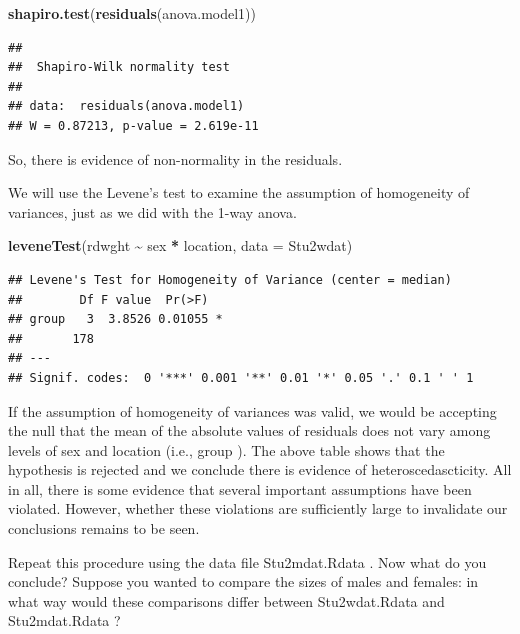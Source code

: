\documentclass[
  12pt,
]{book}
\makeatletter
\newenvironment{Shaded}{\begin{snugshade}}{\end{snugshade}}
\newcommand{\DataTypeTok}[1]{\textcolor[rgb]{0.13,0.29,0.53}{#1}}
\newcommand{\KeywordTok}[1]{\textcolor[rgb]{0.13,0.29,0.53}{\textbf{#1}}}
\newcommand{\NormalTok}[1]{#1}
\newcommand{\OperatorTok}[1]{\textcolor[rgb]{0.81,0.36,0.00}{\textbf{#1}}}
\newcommand{\StringTok}[1]{\textcolor[rgb]{0.31,0.60,0.02}{#1}}
\newenvironment{kframe}{%
\medskip{}
\setlength{\fboxsep}{.8em}
\def\at@end@of@kframe{}%
\ifinner\ifhmode%
 \def\at@end@of@kframe{\end{minipage}}%
 \begin{minipage}{\columnwidth}%
\fi\fi%
\def\FrameCommand##1{\hskip\@totalleftmargin \hskip-\fboxsep
\colorbox{incolor}{##1}\hskip-\fboxsep
    \hskip-\linewidth \hskip-\@totalleftmargin \hskip\columnwidth}%
\MakeFramed {\advance\hsize-\width
  \@totalleftmargin\z@ \linewidth\hsize
  \@setminipage}}%
{\par\unskip\endMakeFramed%
\at@end@of@kframe}
\newenvironment{rmdblock}[1]
 {
 \begin{itemize}
 \renewcommand{\labelitemi}{
   \raisebox{-.7\height}[0pt][0pt]{
     {\setkeys{Gin}{width=3em,keepaspectratio}\texttt{[image: images/\#1]}}
   }
 }
 \begin{kframe}
 \setlength{\fboxsep}{1em}
 \item
 }
 {
 \end{kframe}
 \end{itemize}
 }
\newenvironment{rmdcode}
  {\begin{rmdblock}{screen}}
  {\end{rmdblock}}
\makeatother
\begin{document}
\begin{Shaded}
\begin{Highlighting}[]
\KeywordTok{shapiro.test}\NormalTok{(}\KeywordTok{residuals}\NormalTok{(anova.model1))}
\end{Highlighting}
\end{Shaded}

\begin{verbatim}
## 
##  Shapiro-Wilk normality test
## 
## data:  residuals(anova.model1)
## W = 0.87213, p-value = 2.619e-11
\end{verbatim}

So, there is evidence of non-normality in the residuals.

We will use the Levene's test to examine the assumption of homogeneity of variances, just as we did with the 1-way anova.

\begin{Shaded}
\begin{Highlighting}[]
\KeywordTok{leveneTest}\NormalTok{(rdwght }\OperatorTok{\textasciitilde{}}\StringTok{ }\NormalTok{sex }\OperatorTok{*}\StringTok{ }\NormalTok{location, }\DataTypeTok{data =}\NormalTok{ Stu2wdat)}
\end{Highlighting}
\end{Shaded}

\begin{verbatim}
## Levene's Test for Homogeneity of Variance (center = median)
##        Df F value  Pr(>F)  
## group   3  3.8526 0.01055 *
##       178                  
## ---
## Signif. codes:  0 '***' 0.001 '**' 0.01 '*' 0.05 '.' 0.1 ' ' 1
\end{verbatim}

If the assumption of homogeneity of variances was valid, we would be accepting the null that the mean of the absolute values of residuals does not vary among levels of sex and location (i.e., group ). The above table shows that the hypothesis is rejected and we conclude there is evidence of heteroscedascticity. All in all, there is some evidence that several important assumptions have been violated. However, whether these violations are sufficiently large to invalidate our conclusions remains to be seen.

\begin{rmdcode}
Repeat this procedure using the data file Stu2mdat.Rdata . Now what do you conclude? Suppose you wanted to compare the sizes of males and females: in what way would these comparisons differ between Stu2wdat.Rdata and Stu2mdat.Rdata ?
\end{rmdcode}
\end{document}
